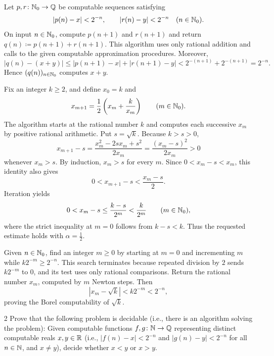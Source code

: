 \documentclass[11pt, oneside]{article}
\begin{document}
\begin{solution}
\begin{problemsubparts}
    \item Let $p, r\colon\mathbb{N}_0\to\mathbb{Q}$ be computable sequences satisfying
    \[
        |p(n)-x|<2^{-n}, \qquad |r(n)-y|<2^{-n}
        \quad(n\in\mathbb{N}_0).
    \]
    On input $n\in\mathbb{N}_0$, compute $p(n+1)$ and $r(n+1)$ and return
    $q(n)\coloneqq p(n+1)+r(n+1)$. This algorithm uses only rational
    addition and calls to the given computable approximation procedures.
    Moreover,
    \[
    |q(n)-(x+y)|
      \le |p(n+1)-x|+|r(n+1)-y|
      <2^{-(n+1)}+2^{-(n+1)}=2^{-n}.
    \]
    Hence $(q(n))_{n\in\mathbb{N}_0}$ computes $x+y$.

    \item Fix an integer $k\ge2$, and define $x_0=k$ and
    \[
        x_{m+1}=\frac12\left(x_m+\frac{k}{x_m}\right)
        \qquad(m\in\mathbb{N}_0).
    \]
    The algorithm starts at the rational number $k$ and computes each
    successive $x_m$ by positive rational arithmetic. Put $s=\sqrt{k}$.
    Because $k>s>0$,
    \[
      x_{m+1}-s
      =\frac{x_m^2-2sx_m+s^2}{2x_m}
      =\frac{(x_m-s)^2}{2x_m}>0
    \]
    whenever $x_m>s$. By induction, $x_m>s$ for every $m$.
    Since $0<x_m-s<x_m$, this identity also gives
    \[
      0<x_{m+1}-s<\frac{x_m-s}{2}.
    \]
    Iteration yields
    \[
      0<x_m-s\le\frac{k-s}{2^m}<\frac{k}{2^m}
      \qquad(m\in\mathbb{N}_0),
    \]
    where the strict inequality at $m=0$ follows from $k-s<k$.
    Thus the requested estimate holds with $\alpha=\tfrac12$.

    Given $n\in\mathbb{N}_0$, find an integer $m\ge0$ by starting at $m=0$
    and incrementing $m$ while $k2^{-m}\ge2^{-n}$.
    This search terminates because repeated division by $2$ sends
    $k2^{-m}$ to $0$, and its test uses only rational comparisons.
    Return the rational number $x_m$, computed by $m$ Newton steps.
    Then
    \[
       |x_m-\sqrt{k}|<k2^{-m}<2^{-n},
    \]
    proving the Borel computability of $\sqrt{k}$.
\end{problemsubparts}
\end{solution}

\begin{problem}{2}
Prove that the following problem is decidable (i.e., there is an algorithm
solving the problem): Given computable functions $f, g\colon\mathbb{N}\to\mathbb{Q}$
representing distinct computable reals $x, y\in\mathbb{R}$ (i.e.,
$|f(n)-x|<2^{-n}$ and $|g(n)-y|<2^{-n}$ for all $n\in\mathbb{N}$,
and $x\ne y$), decide whether $x<y$ or $x>y$.
\end{problem}
\end{document}
